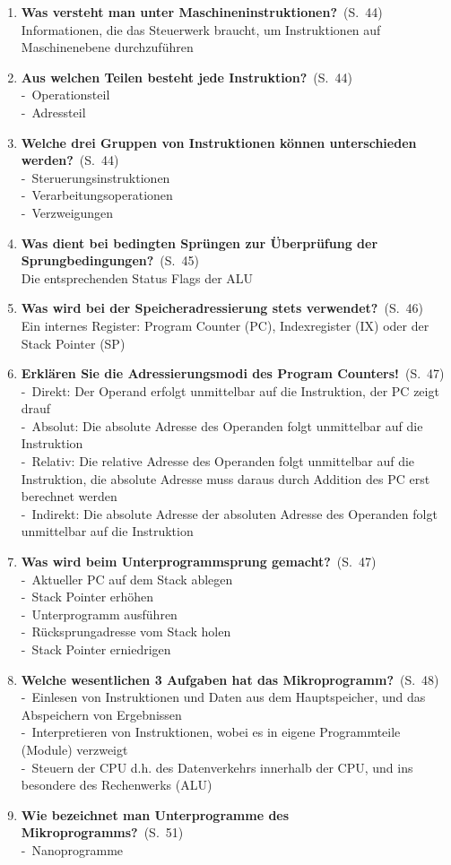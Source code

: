 \documentclass[a4paper,12pt]{article}
\newcommand{\question}[3]{\pagebreak[3]\item {\textbf{#1?}}\ (S.\ #2)#3}
\newcommand{\statement}[3]{\pagebreak[3]\item {\textbf{#1!}}\ (S.\ #2)#3}
\newcommand{\catchword}[1]{\\-\ #1}
\newcommand{\normaltext}[1]{\\#1}
\newcommand{\page}[1]{#1}
\begin{document}
\begin{enumerate}
  \question{Was versteht man unter Maschineninstruktionen}{\page{44}}
  {
    \normaltext{Informationen, die das Steuerwerk braucht, um Instruktionen auf 
                Maschinenebene durchzuführen}
  }

  \question{Aus welchen Teilen besteht jede Instruktion}{\page{44}}
  {
    \catchword{Operationsteil}
    \catchword{Adressteil}
  }

  \question{Welche drei Gruppen von Instruktionen können unterschieden werden}{\page{44}}
  {
    \catchword{Steruerungsinstruktionen}
    \catchword{Verarbeitungsoperationen}
    \catchword{Verzweigungen}
  }

  \question{Was dient bei bedingten Sprüngen zur Überprüfung der Sprungbedingungen}{\page{45}}
  {
    \normaltext{Die entsprechenden Status Flags der ALU}
  }

  \question{Was wird bei der Speicheradressierung stets verwendet}{\page{46}}
  {
    \normaltext{Ein internes Register: Program Counter (PC), Indexregister (IX)
                oder der Stack Pointer (SP)}
  }

  \statement{Erklären Sie die Adressierungsmodi des Program Counters}{\page{47}}
  {
    \catchword{Direkt: Der Operand erfolgt unmittelbar auf die Instruktion, der PC zeigt drauf}
    \catchword{Absolut: Die absolute Adresse des Operanden folgt unmittelbar auf die Instruktion}
    \catchword{Relativ: Die relative Adresse des Operanden folgt unmittelbar auf die Instruktion,
               die absolute Adresse muss daraus durch Addition des PC erst berechnet werden}
    \catchword{Indirekt: Die absolute Adresse der absoluten Adresse des Operanden folgt unmittelbar
               auf die Instruktion}
  }

  \question{Was wird beim Unterprogrammsprung gemacht}{\page{47}}
  {
    \catchword{Aktueller PC auf dem Stack ablegen}
    \catchword{Stack Pointer erhöhen}
    \catchword{Unterprogramm ausführen}
    \catchword{Rücksprungadresse vom Stack holen}
    \catchword{Stack Pointer erniedrigen}
  }

  \question{Welche wesentlichen 3 Aufgaben hat das Mikroprogramm}{\page{48}}
  {
    \catchword{Einlesen von Instruktionen und Daten aus dem Hauptspeicher, und das Abspeichern 
               von Ergebnissen}
    \catchword{Interpretieren von Instruktionen, wobei es in eigene Programmteile (Module) verzweigt}
    \catchword{Steuern der CPU d.h. des Datenverkehrs innerhalb der CPU, und ins besondere 
               des Rechenwerks (ALU)}
  }

  \question{Wie bezeichnet man Unterprogramme des Mikroprogramms}{\page{51}}
  {
    \catchword{Nanoprogramme}
  }


\end{enumerate}
\end{document}
